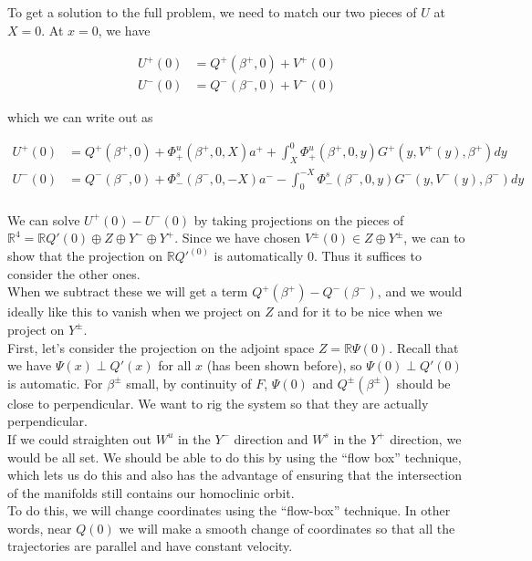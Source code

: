 \documentclass[12pt]{article}
\def\R{{\mathbb R}}
\begin{document}
To get a solution to the full problem, we need to match our two pieces of $U$ at $X = 0$. At $x = 0$, we have

\begin{align*}
U^+(0) &= Q^+(\beta^+, 0) + V^+(0) \\
U^-(0) &= Q^-(\beta^-, 0) + V^-(0)
\end{align*}

which we can write out as

\begin{align*}
U^+(0) &= Q^+(\beta^+, 0) + \Phi^u_+(\beta^+, 0, X) a^+ + \int_{X}^0 \Phi_+^u(\beta^+, 0, y) G^+(y, V^+(y),\beta^+)dy \\
U^-(0) &= Q^-(\beta^-, 0) + \Phi^s_-(\beta^-, 0, -X) a^- - \int_0^{-X} \Phi_-^s(\beta^-, 0, y) G^-(y, V^-(y),\beta^-)dy \\
\end{align*}

We can solve $U^+(0) - U^-(0)$ by taking projections on the pieces of $\R^4 = \R Q'(0) \oplus Z \oplus Y^- \oplus Y^+$. Since we have chosen $V^\pm(0) \in Z \oplus Y^\pm$, we can to show that the projection on $\R Q'^(0)$ is automatically 0. Thus it suffices to consider the other ones.\\

When we subtract these we will get a term $Q^+(\beta^+) - Q^-(\beta^-)$, and we would ideally like this to vanish when we project on $Z$ and for it to be nice when we project on $Y^\pm$. \\

First, let's consider the projection on the adjoint space $Z = \R \Psi(0)$. Recall that we have $\Psi(x) \perp Q'(x)$ for all $x$ (has been shown before), so 
$\Psi(0) \perp Q'(0)$ is automatic. For $\beta^\pm$ small, by continuity of $F$, $\Psi(0)$ and $Q^\pm(\beta^\pm)$ should be close to perpendicular. We want to rig the system so that they are actually perpendicular. \\

If we could straighten out $W^u$ in the $Y^-$ direction and $W^s$ in the $Y^+$ direction, we would be all set. We should be able to do this by using the ``flow box'' technique, which lets us do this and also has the advantage of ensuring that the intersection of the manifolds still contains our homoclinic orbit.\\

To do this, we will change coordinates using the ``flow-box'' technique. In other words, near $Q(0)$ we will make a smooth change of coordinates so that all the trajectories are parallel and have constant velocity.\\
\end{document}
